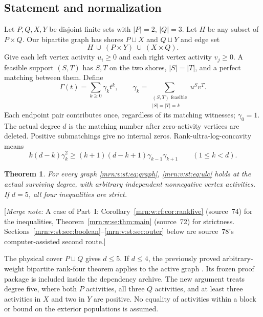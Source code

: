 \documentclass[11pt,a4paper]{article}
\newtheorem{theorem}{Theorem}[section]
\theoremstyle{remark}\newtheorem{remark}[theorem]{Remark}
\newcommand{\mnote}[1]{[\textit{Merge note:} #1]}
\begin{document}
\subsection{Statement and normalization}
Let $P,Q,X,Y$ be disjoint finite sets with $|P|=2$, $|Q|=3$. Let $H$ be
any subset of $P\times Q$. Our bipartite graph has shores $P\sqcup X$ and
$Q\sqcup Y$ and edge set
\begin{equation}\label{mrn:v:st:eq:graph}
 H\ \cup\ (P\times Y)\ \cup\ (X\times Q).
\end{equation}
Give each left vertex activity $u_i\ge0$ and each right vertex activity
$v_j\ge0$. A feasible support $(S,T)$ has $S,T$ on the two shores,
$|S|=|T|$, and a perfect matching between them. Define
\[
 \Gamma(t)=\sum_{k\ge0}\gamma_kt^k,\qquad
 \gamma_k=\sum_{\substack{(S,T)\text{ feasible}\\|S|=|T|=k}}u^Sv^T.
\]
Each endpoint pair contributes once, regardless of its matching witnesses;
$\gamma_0=1$. The actual degree $d$ is the matching number after
zero-activity vertices are deleted. Positive submatchings give no internal
zeros. Rank-ultra-log-concavity means
\begin{equation}\label{mrn:v:st:eq:ulc}
 k(d-k)\gamma_k^2\ge(k+1)(d-k+1)\gamma_{k-1}\gamma_{k+1}
 \qquad(1\le k<d).
\end{equation}
\begin{theorem}\label{mrn:v:st:thm:main}
For every graph \eqref{mrn:v:st:eq:graph}, \eqref{mrn:v:st:eq:ulc} holds at the actual
surviving degree, with arbitrary independent nonnegative vertex activities.
If $d=5$, all four inequalities are strict.
\end{theorem}
\mnote{A case of Part~I: Corollary~\ref{mrn:w:rf:cor:rankfive} (source~74) for
the inequalities, Theorem~\ref{mrn:w:se:thm:main} (source~72) for
strictness. Sections~\ref{mrn:v:st:sec:boolean}--\ref{mrn:v:st:sec:outer}
below are source~78's computer-assisted second route.}

The physical cover $P\sqcup Q$ gives $d\le5$. If $d\le4$, the previously
proved arbitrary-weight bipartite rank-four theorem applies to the active
graph \cite[Theorem 1.1]{b:m77}. Its frozen proof package is included
inside the dependency archive. The new argument treats degree five, where
both $P$ activities, all three $Q$ activities, and at least three activities
in $X$ and two in $Y$ are positive. No equality of activities within a block
or bound on the exterior populations is assumed.
\end{document}
